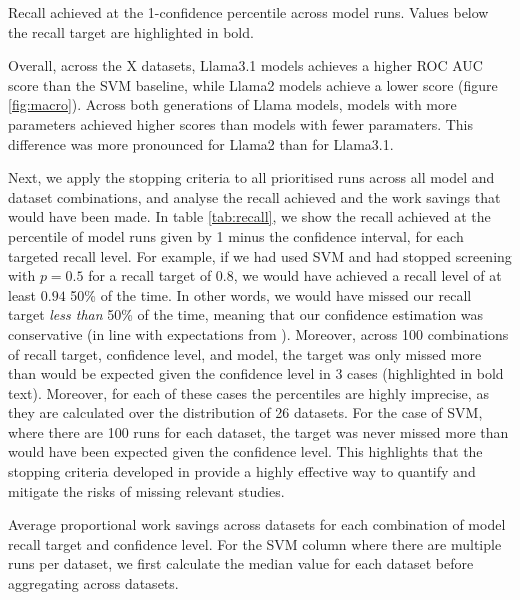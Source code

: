 \documentclass{article}
\begin{document}
\begin{table}
	\centering
	
	\caption{Recall achieved at the 1-confidence percentile across model runs. Values below the recall target are highlighted in bold.}
	\label{tab:recall}
\end{table}

	
	
	Overall, across the X datasets, Llama3.1 models achieves a higher ROC AUC score than the SVM baseline, while Llama2 models achieve a lower score (figure \ref{fig:macro}). Across both generations of Llama models, models with more parameters achieved higher scores than models with fewer paramaters. This difference was more pronounced for Llama2 than for Llama3.1. 
	
	Next, we apply the stopping criteria to all prioritised runs across all model and dataset combinations, and analyse the recall achieved and the work savings that would have been made. In table \ref{tab:recall}, we show the recall achieved at the percentile of model runs given by 1 minus the confidence interval, for each targeted recall level. 
	For example, if we had used SVM and had stopped screening with $p=0.5$ for a recall target of $0.8$, we would have achieved a recall level of at least $0.94$ 50\% of the time. In other words, we would have missed our recall target \textit{less than} 50\% of the time, meaning that our confidence estimation was conservative (in line with expectations from \cite{callaghan_statistical_2020}).
	Moreover, across 100 combinations of recall target, confidence level, and model, the target was only missed more than would be expected given the confidence level in 3 cases (highlighted in bold text). Moreover, for each of these cases the percentiles are highly imprecise, as they are calculated over the distribution of 26 datasets. For the case of SVM, where there are 100 runs for each dataset, the target was never missed more than would have been expected given the confidence level. This highlights that the stopping criteria developed in \cite{callaghan_statistical_2020} provide a highly effective way to quantify and mitigate the risks of missing relevant studies.
	
	\begin{table}
		\centering
		
		\caption{Average proportional work savings across datasets for each combination of  model recall target and confidence level. For the SVM column where there are multiple runs per dataset, we first calculate the median value for each dataset before aggregating across datasets.}
		\label{tab:wssp}
	\end{table}
	
\end{document}
